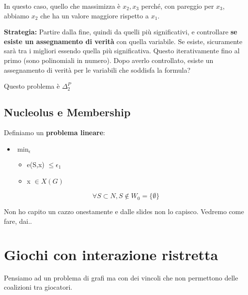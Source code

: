 In questo caso, quello che massimizza è $x_2, x_3$ perché, con pareggio per
$x_3$, abbiamo $x_2$ che ha un valore maggiore rispetto a $x_1$.

\textbf{Strategia:} Partire dalla fine, quindi da quelli più significativi, e controllare \textbf{se esiste un assegnamento di verità} con quella variabile. Se esiste, sicuramente sarà tra i migliori essendo quella più significativa. Questo iterativamente fino al primo (sono polinomiali in numero). Dopo averlo controllato,
esiste un assegnamento di verità per le variabili che soddisfa la formula?

Questo problema è \textbf{$\Delta^P_2$}

\subsection{Nucleolus e Membership}

Definiamo un \textbf{problema lineare}:

\begin{itemize}
    \item $\min_\epsilon$
          \begin{itemize}
              \item e(S,x) $\leq \epsilon_1$
              \item x $\in X(G)$
          \end{itemize}
\end{itemize}

\[
    \forall S \subset N, S \notin W_0 = \{\emptyset\}
\]

Non ho capito un cazzo onestamente e dalle slides non lo capisco. Vedremo come
fare, dai..

\section{Giochi con interazione ristretta}

Pensiamo ad un problema di grafi ma con dei vincoli che non permettono delle
coalizioni tra giocatori.

